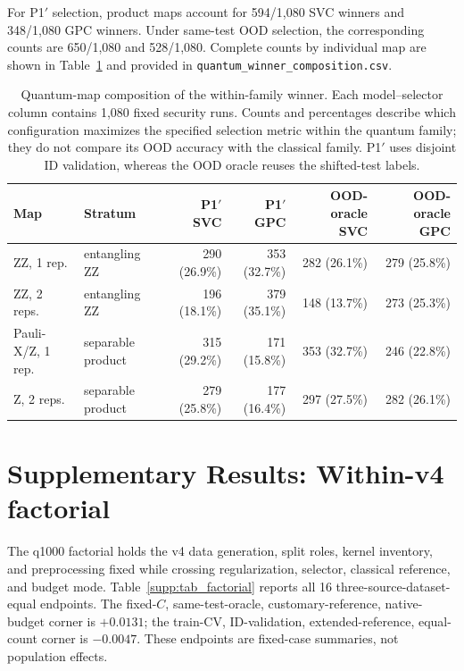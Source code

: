\documentclass[11pt]{article}
\begin{document}
For P1$'$ selection, product maps account for 594/1,080 SVC winners and
348/1,080 GPC winners. Under same-test OOD selection, the corresponding
counts are 650/1,080 and 528/1,080. Complete counts by individual map are
shown in Table~\ref{supp:tab_quantum_winners} and provided in
\texttt{quantum\_winner\_composition.csv}.

\begin{table}[htbp]
\centering
\caption{Quantum-map composition of the within-family winner. Each
model--selector column contains 1,080 fixed security runs. Counts and
percentages describe which configuration maximizes the specified selection
metric within the quantum family; they do not compare its OOD accuracy with
the classical family. P1$'$ uses disjoint ID validation, whereas the OOD
oracle reuses the shifted-test labels.}
\label{supp:tab_quantum_winners}
\scriptsize
\setlength{\tabcolsep}{3.2pt}
\begin{tabular}{llrrrr}
\toprule
Map & Stratum & P1$'$ SVC & P1$'$ GPC & OOD-oracle SVC & OOD-oracle GPC \\
\midrule
ZZ, 1 rep. & entangling ZZ & 290 (26.9\%) & 353 (32.7\%) & 282 (26.1\%) & 279 (25.8\%) \\
ZZ, 2 reps. & entangling ZZ & 196 (18.1\%) & 379 (35.1\%) & 148 (13.7\%) & 273 (25.3\%) \\
Pauli-X/Z, 1 rep. & separable product & 315 (29.2\%) & 171 (15.8\%) & 353 (32.7\%) & 246 (22.8\%) \\
Z, 2 reps. & separable product & 279 (25.8\%) & 177 (16.4\%) & 297 (27.5\%) & 282 (26.1\%) \\
\bottomrule
\end{tabular}
\end{table}

\section*{Supplementary Results: Within-v4 factorial}
\label{supp:factorial}

The q1000 factorial holds the v4 data generation, split roles, kernel
inventory, and preprocessing fixed while crossing regularization, selector,
classical reference, and budget mode. Table~\ref{supp:tab_factorial} reports
all 16 three-source-dataset-equal endpoints. The fixed-$C$, same-test-oracle,
customary-reference, native-budget corner is $+0.0131$; the train-CV,
ID-validation, extended-reference, equal-count corner is $-0.0047$.
These endpoints are fixed-case summaries, not population effects.
\end{document}
